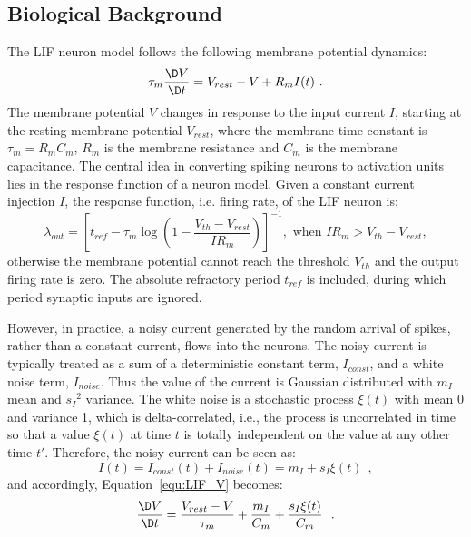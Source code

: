 	\subsection{Biological Background}
	\label{sec:siergert}
	The LIF neuron model follows the following membrane potential dynamics:
	\begin{equation}
	\tau_m \frac{\D V}{\D t}=V_{rest} - V + R_{m} I(t) ~.
	\label{equ:LIF_V}
	\end{equation}
	The membrane potential $V$ changes in response to the input current $I$, starting at the resting membrane potential $V_{rest}$, where the membrane time constant is $\tau_m = R_mC_m$, $R_m$ is the membrane resistance and $C_m$ is the membrane capacitance.
	The central idea in converting spiking neurons to activation units lies in the response function of a neuron model.
	Given a constant current injection $I$, the response function, i.e. firing rate, of the LIF neuron is:
	\begin{equation}
	\lambda_\mathit{out}=
	\left [ t_\mathit{ref}-\tau_m\log \left ( 1-\frac{V_{th}-V_\mathit{rest}}{IR_m}  \right )\right ]^{-1}, \textrm{~when~} IR_m>V_{th}-V_{rest},
	\label{equ:consI}
	\end{equation}
	otherwise the membrane potential cannot reach the threshold $V_{th}$ and the output firing rate is zero. 
	The absolute refractory period $t_\mathit{ref}$ is included, during which period synaptic inputs are ignored.

	However, in practice, a noisy current generated by the random arrival of spikes, rather than a constant current, flows into the neurons.
	The noisy current is typically treated as a sum of a deterministic constant term, $I_{const}$, and a white noise term, $I_{noise}$.
	Thus the value of the current is Gaussian distributed with $m_I$ mean and ${s_I}^2$ variance.
	The white noise is a stochastic process $\xi(t)$ with mean 0 and variance 1, which is delta-correlated, i.e., the process is uncorrelated in time so that a value $\xi(t)$ at time $t$ is totally independent on the value at any other time $t'$.
	Therefore, the noisy current can be seen as:
	\begin{equation}
	I(t) = I_{const}(t)+I_{noise}(t) = m_I + s_I\xi(t)~~,
	\label{equ:noisyI}
	\end{equation}
	and accordingly, Equation~\ref{equ:LIF_V} becomes:
	\begin{equation}
	\frac{\D V}{\D t}=\frac{V_{rest} - V}{\tau_m } + \frac{m_I}{C_m} + \frac{s_I\xi(t)}{C_m}~~.
	\label{equ:LIF_V2}
	\end{equation}

